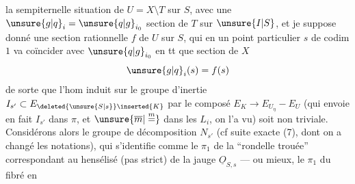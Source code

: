la sempiternelle situation de $U=X\setminus T$ sur $S$, avec une $\unsure{g|q}_i=\unsure{q|g}_{i_0}$ section de $T$ sur $\unsure{I|S}$, et je suppose donné une section rationnelle $f$ de $U$ sur $S$, qui en un point particulier $s$ de  codim $1$ va coïncider avec $\unsure{q|g}_{i_0}$ en tt que section de $X$
\[
\unsure{g|q}_i(s)=f(s)
\]
de sorte que l'hom induit sur le groupe d'inertie $I_{s'}\subset E_{\deleted{\unsure{S|s}}\inserted{K}}$ par le composé $E_K\longrightarrow E_{U_\eta}-E_U$ (qui envoie en fait $I_{s'}$ dans $\pi$, et $\unsure{\overline m|\overset{m}{=}}$ dans les $L_i$, on l'a vu) soit non  triviale. Considérons alors le groupe de décomposition $N_{s'}$ (cf suite exacte (7), dont on a changé les notations), qui s'identifie comme le $\pi_1$ de la ``rondelle trouée'' correspondant au hensélisé (pas strict) de la jauge $\underline O_{S,s}$ --- ou mieux, le $\pi_1$ du fibré en
